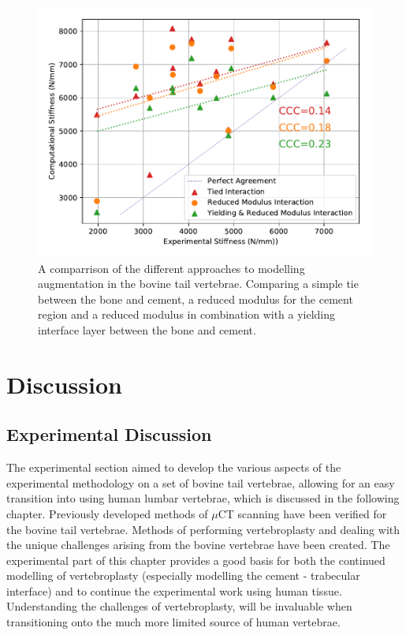 \begin{figure}[ht!]
\centering
\includegraphics[width=5.3in]{images/exp_50_yield_tied.pdf}
	\caption[A comparrison of the different approaches to modelling augmentation in the bovine tail vertebrae.]{A comparrison of the different approaches to modelling augmentation in the bovine tail vertebrae. Comparing a simple tie between the bone and cement, a reduced modulus for the cement region and a reduced modulus in combination with a yielding interface layer between the bone and cement.}
	\label{fig:exp_50_yield_tied}
\end{figure}

\section{Discussion}

\subsection{Experimental Discussion}

The experimental section aimed to develop the various aspects of the
experimental methodology on a set of bovine tail vertebrae, allowing for an
easy transition into using human lumbar vertebrae, which is discussed in the
following chapter.  Previously developed methods of $\mu$CT scanning have been
verified for the bovine tail vertebrae.  Methods of performing vertebroplasty
and dealing with the unique challenges arising from the bovine vertebrae have
been created.  The experimental part of this chapter provides a good basis for
both the continued modelling of vertebroplasty (especially modelling the cement
- trabecular interface) and to continue
the experimental work using human tissue.  Understanding the challenges of
vertebroplasty, will be invaluable when transitioning
onto the much more limited source of human vertebrae.

